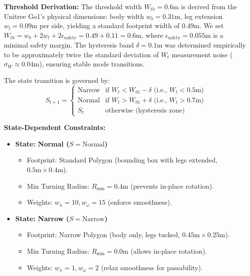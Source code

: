 \documentclass[lettersize,journal]{IEEEtran}
\begin{document}
\textbf{Threshold Derivation:} The threshold width $W_{th} = 0.6\text{m}$ is derived from the Unitree Go1's physical dimensions: body width $w_b = 0.31\text{m}$, leg extension $w_l = 0.09\text{m}$ per side, yielding a standard footprint width of $0.49\text{m}$. We set $W_{th} = w_b + 2w_l + 2\epsilon_{\text{safety}} = 0.49 + 0.11 = 0.6\text{m}$, where $\epsilon_{\text{safety}} = 0.055\text{m}$ is a minimal safety margin. The hysteresis band $\delta = 0.1\text{m}$ was determined empirically to be approximately twice the standard deviation of $W_t$ measurement noise ($\sigma_W \approx 0.04\text{m}$), ensuring stable mode transitions.

The state transition is governed by:
\begin{equation}
S_{t+1} = \begin{cases} 
\text{Narrow} & \text{if } W_t < W_{th} - \delta \text{ (i.e., } W_t < 0.5\text{m)} \\
\text{Normal} & \text{if } W_t > W_{th} + \delta \text{ (i.e., } W_t > 0.7\text{m)} \\
S_t & \text{otherwise (hysteresis zone)}
\end{cases}
\end{equation}

\textbf{State-Dependent Constraints:}
\begin{itemize}
\item \textbf{State: Normal ($S = \text{Normal}$)}
    \begin{itemize}
    \item Footprint: Standard Polygon (bounding box with legs extended, $0.5\text{m} \times 0.4\text{m}$).
    \item Min Turning Radius: $R_{\min} = 0.4\text{m}$ (prevents in-place rotation).
    \item Weights: $w_{\kappa} = 10, w_{\dot{\omega}} = 15$ (enforce smoothness).
    \end{itemize}
\item \textbf{State: Narrow ($S = \text{Narrow}$)}
    \begin{itemize}
    \item Footprint: Narrow Polygon (body only, legs tucked, $0.45\text{m} \times 0.25\text{m}$).
    \item Min Turning Radius: $R_{\min} = 0.0\text{m}$ (allows in-place rotation).
    \item Weights: $w_{\kappa} = 1, w_{\dot{\omega}} = 2$ (relax smoothness for passability).
    \end{itemize}
\end{itemize}
\end{document}
